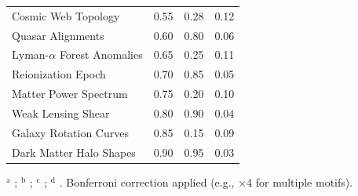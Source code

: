 \documentclass[11pt,a4paper]{article}
\begin{document}
\begin{table}[H]
\begin{tabular}{lccc}
Cosmic Web Topology & 0.55 & 0.28 & 0.12 \\
Quasar Alignments & 0.60 & 0.80 & 0.06 \\
Lyman-$\alpha$ Forest Anomalies & 0.65 & 0.25 & 0.11 \\
Reionization Epoch & 0.70 & 0.85 & 0.05 \\
Matter Power Spectrum & 0.75 & 0.20 & 0.10 \\
Weak Lensing Shear & 0.80 & 0.90 & 0.04 \\
Galaxy Rotation Curves & 0.85 & 0.15 & 0.09 \\
Dark Matter Halo Shapes & 0.90 & 0.95 & 0.03 \\
\bottomrule
\end{tabular}
\label{tab:cosmological}
\begin{flushleft}
\footnotesize
$^{\text{a}}$ \cite{planck2018}; $^{\text{b}}$ \cite{planck_anomalies}; $^{\text{c}}$ \cite{planck_anomalies}; $^{\text{d}}$ \cite{planck_anomalies}. Bonferroni correction applied (e.g., ×4 for multiple motifs).
\end{flushleft}
\end{table}
\end{document}
